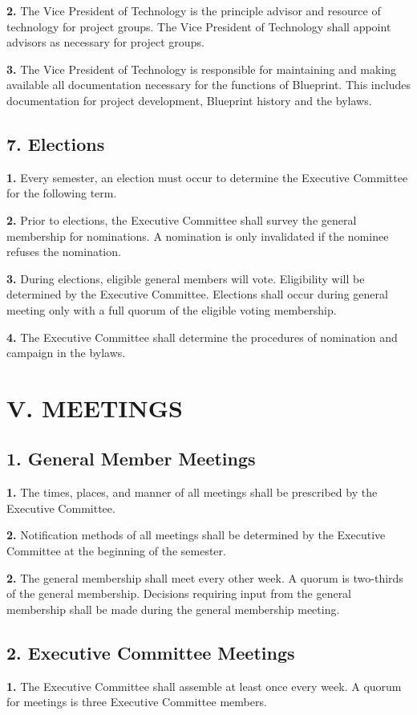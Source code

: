 \documentclass{article}
\begin{document}
\textbf{2.} The Vice President of Technology is the principle advisor and resource of technology for project groups. The Vice President of Technology shall appoint advisors as necessary for project groups.

\textbf{3.} The Vice President of Technology is responsible for maintaining and making available all documentation necessary for the functions of Blueprint. This includes documentation for project development, Blueprint history and the bylaws.

\subsection{7. Elections}
\textbf{1.} Every semester, an election must occur to determine the Executive Committee for the following term. 

\textbf{2.} Prior to elections, the Executive Committee shall survey the general membership for nominations. A nomination is only invalidated if the nominee refuses the nomination.

\textbf{3.} During elections, eligible general members will vote. Eligibility will be determined by the Executive Committee. Elections shall occur during general meeting only with a full quorum of the eligible voting membership.

\textbf{4.} The Executive Committee shall determine the procedures of nomination and campaign in the bylaws.

\section{V. MEETINGS}
\subsection{1. General Member Meetings}
\textbf{1.} The times, places, and manner of all meetings shall be prescribed by the Executive Committee.

\textbf{2.} Notification methods of all meetings shall be determined by the Executive Committee at the beginning of the semester.

\textbf{2.} The general membership shall meet every other week. A quorum is two-thirds of the general membership. Decisions requiring input from the general membership shall be made during the general membership meeting.

\subsection{2. Executive Committee Meetings}
\textbf{1.} The Executive Committee shall assemble at least once every week. A quorum for meetings is three Executive Committee members.
\end{document}
